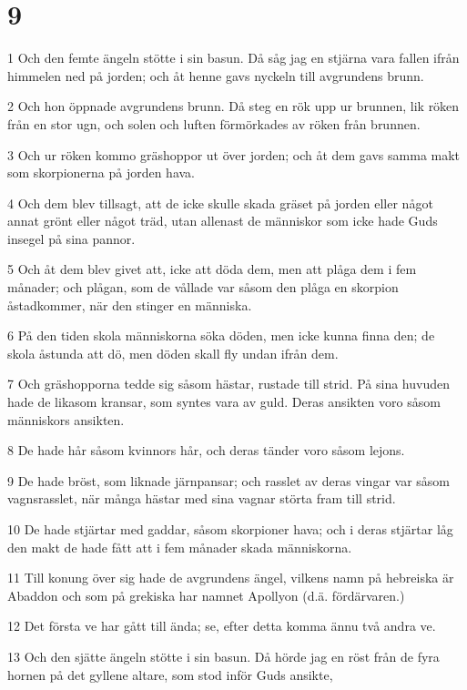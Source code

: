 \chapter{9}

\par 1 Och den femte ängeln stötte i sin basun. Då såg jag en stjärna vara fallen ifrån himmelen ned på jorden; och åt henne gavs nyckeln till avgrundens brunn.
\par 2 Och hon öppnade avgrundens brunn. Då steg en rök upp ur brunnen, lik röken från en stor ugn, och solen och luften förmörkades av röken från brunnen.
\par 3 Och ur röken kommo gräshoppor ut över jorden; och åt dem gavs samma makt som skorpionerna på jorden hava.
\par 4 Och dem blev tillsagt, att de icke skulle skada gräset på jorden eller något annat grönt eller något träd, utan allenast de människor som icke hade Guds insegel på sina pannor.
\par 5 Och åt dem blev givet att, icke att döda dem, men att plåga dem i fem månader; och plågan, som de vållade var såsom den plåga en skorpion åstadkommer, när den stinger en människa.
\par 6 På den tiden skola människorna söka döden, men icke kunna finna den; de skola åstunda att dö, men döden skall fly undan ifrån dem.
\par 7 Och gräshopporna tedde sig såsom hästar, rustade till strid. På sina huvuden hade de likasom kransar, som syntes vara av guld. Deras ansikten voro såsom människors ansikten.
\par 8 De hade hår såsom kvinnors hår, och deras tänder voro såsom lejons.
\par 9 De hade bröst, som liknade järnpansar; och rasslet av deras vingar var såsom vagnsrasslet, när många hästar med sina vagnar störta fram till strid.
\par 10 De hade stjärtar med gaddar, såsom skorpioner hava; och i deras stjärtar låg den makt de hade fått att i fem månader skada människorna.
\par 11 Till konung över sig hade de avgrundens ängel, vilkens namn på hebreiska är Abaddon och som på grekiska har namnet Apollyon (d.ä. fördärvaren.)
\par 12 Det första ve har gått till ända; se, efter detta komma ännu två andra ve.
\par 13 Och den sjätte ängeln stötte i sin basun. Då hörde jag en röst från de fyra hornen på det gyllene altare, som stod inför Guds ansikte,
